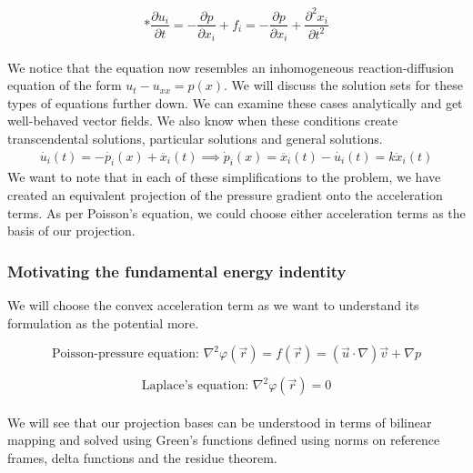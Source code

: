 \documentclass[12pt]{article}
\begin{document}
\[
* \frac{\partial u_{i}}{\partial t} = -\frac{\partial p}{\partial x_{i}} + f_{i} = -\frac{\partial p}{\partial x_{i}} + \frac{\partial^{2} x_{i}}{\partial t^{2}}
\] \\ 
We notice that the equation now resembles an inhomogeneous reaction-diffusion equation of the form $u_{t} - u_{xx} = p(x)$. We will discuss the solution sets for these types of equations further down. We can examine these cases analytically and get well-behaved vector fields. We also know when these conditions create transcendental solutions, particular solutions and general solutions.
\begin{align}
 \dot{u_{i}}(t) = -\dot{p_{i}}(x) + \ddot{x_{i}}(t) \implies \dot p_{i}(x) = \ddot{x_{i}}(t) - \dot{u_{i}}(t) = k \ddot x_{i}(t)
\end{align}
We want to note that in each of these simplifications to the problem, we have created an equivalent projection of the pressure gradient onto the acceleration terms. As per Poisson's equation, we could choose either acceleration terms as the basis of our projection. 

\subsubsection{Motivating the fundamental energy indentity}
We will choose the convex acceleration term as we want to understand its formulation as the potential more. 

\[\text{Poisson-pressure equation: }\nabla^{2}\varphi(\vec r) = f (\vec r) = (\vec u \cdot \nabla )\vec v + \nabla p\]
 
\[\text{Laplace's equation: }\nabla^{2}\varphi(\vec r) = 0\] \\ 
We will see that our projection bases can be understood in terms of bilinear mapping and solved using Green's functions defined using norms on reference frames, delta functions and the residue theorem.
\end{document}
